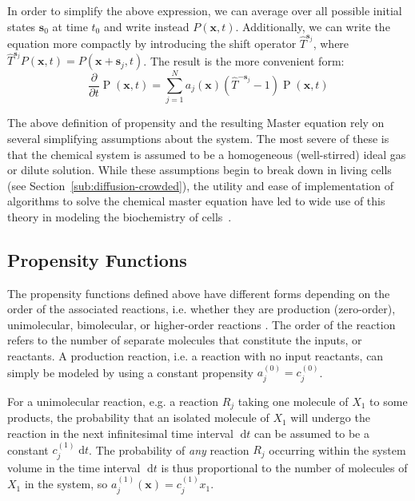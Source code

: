 \documentclass[english,letterpaper,12pt]{report}
\newcommand{\dee}{\;\mathrm{d}}
\renewcommand{\vec}[1]{\ensuremath{\mathbf{#1}}}
\DeclareMathOperator{\Prob}{P}
\begin{document}
\begin{doublespacing}
In order to simplify the above expression, we can average over all possible initial states $\vec{s}_0$ at time $t_0$ and write instead $P(\vec{x}, t)$. Additionally, we can write the equation more compactly by introducing the shift operator $\hat{T}^{\vec{s}_j}$, where $\hat{T}^{\vec{s}_j} P(\vec{x}, t) = P(\vec{x} + \vec{s}_j, t)$. The result is the more convenient form:
\begin{equation}
    \frac{\partial}{\partial t} \Prob(\vec{x}, t) = \sum_{j=1}^N a_j(\vec{x})(\hat{T}^{-\vec{s}_j} - 1)\Prob(\vec{x}, t)
    \label{eq:master-eqn}
\end{equation}

The above definition of propensity and the resulting Master equation rely on several simplifying assumptions about the system. The most severe of these is that the chemical system is assumed to be a homogeneous (well-stirred) ideal gas or dilute solution.  While these assumptions begin to break down in living cells (see Section~\ref{sub:diffusion-crowded}), the utility and ease of implementation of algorithms to solve the chemical master equation have led to wide use of this theory in modeling the biochemistry of cells~\cite{we-chemkin}\cite{stoch-sys-bio}.

\subsection{Propensity Functions} %
\label{sub:propensities}

The propensity functions defined above have different forms depending on the order of the associated reactions, i.e. whether they are production (zero-order), unimolecular, bimolecular, or higher-order reactions \cite{gillespie-ssa}. The order of the reaction refers to the number of separate molecules that constitute the inputs, or reactants. A production reaction, i.e. a reaction with no input reactants, can simply be modeled by using a constant propensity $a_j^{(0)} = c_j^{(0)}$. 

For a unimolecular reaction, e.g. a reaction $R_j$ taking one molecule of $X_1$ to some products, the probability that an isolated molecule of $X_1$ will undergo the reaction in the next infinitesimal time interval $\dee t$ can be assumed to be a constant $c_j^{(1)} \dee t$. The probability of \emph{any} reaction $R_j$ occurring within the system volume in the time interval $\dee t$ is thus proportional to the number of molecules of $X_1$ in the system, so $a_j^{(1)}(\vec{x}) = c_j^{(1)} x_1$.


\end{doublespacing}
\end{document}
